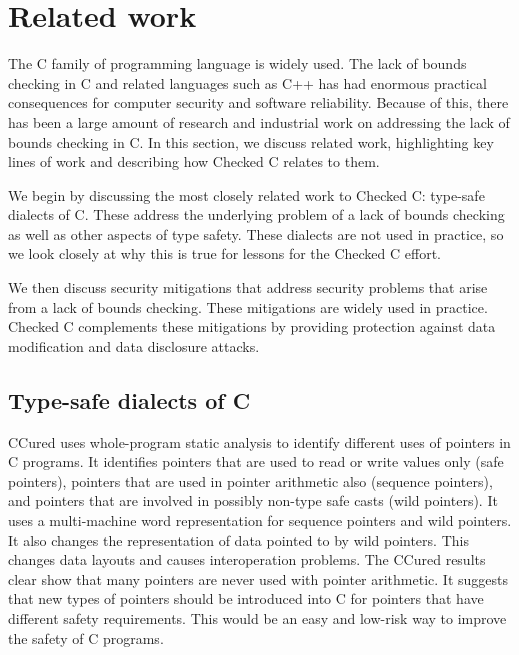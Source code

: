 
\chapter{Related work}
\label{chapter:lessons}

The C family of programming language is widely used.  The lack of
bounds checking in C and related languages such as C++ has had
enormous practical consequences for computer security and software 
reliability.  Because of this, there has been a large amount of
research and industrial work on addressing the lack of bounds
checking in C.  In this section, we discuss related work,  
highlighting key lines of work and describing how Checked C relates to them. 

We begin by discussing the most closely related work to Checked C:
type-safe dialects of C.  These address the underlying problem of
a lack of bounds checking as well as other aspects of type safety.
These dialects are not used in practice, so we look closely at why
this is true for lessons for the Checked C effort.

We then discuss security mitigations that address
security problems that arise from a lack of bounds checking.
These mitigations are widely used in practice.   Checked C
complements these mitigations by providing protection against data
modification and data disclosure attacks.

\section{Type-safe dialects of C}

CCured \cite{Necula2005} uses whole-program static analysis to identify 
different uses of pointers in C programs. It identifies pointers that are used to
read or write values only (safe pointers), pointers that are used in pointer
arithmetic also (sequence pointers), and pointers that are involved in
possibly non-type safe casts (wild pointers). It uses a multi-machine
word representation for sequence pointers and wild pointers. It also
changes the representation of data pointed to by wild pointers. This
changes data layouts and causes interoperation problems. The CCured
results clear show that many pointers are never used with pointer
arithmetic. It suggests that new types of pointers should be introduced
into C for pointers that have different safety requirements. This would
be an easy and low-risk way to improve the safety of C programs.

